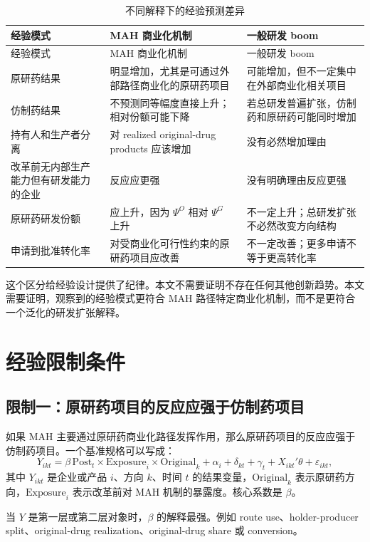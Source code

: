 \documentclass[12pt]{article}
\newcommand{\Post}{\mathrm{Post}}
\newcommand{\Original}{\mathrm{Original}}
\newcommand{\Exposure}{\mathrm{Exposure}}
\begin{document}
\begin{longtable}{p{}p{}p{}}
\caption{不同解释下的经验预测差异}\label{tab:rdboom_cn}\\
\toprule
经验模式 & MAH 商业化机制 & 一般研发 boom \\
\midrule
\endfirsthead
\toprule
经验模式 & MAH 商业化机制 & 一般研发 boom \\
\midrule
\endhead
原研药结果 & 明显增加，尤其是可通过外部路径商业化的原研药项目 & 可能增加，但不一定集中在外部商业化相关项目 \\
\addlinespace
仿制药结果 & 不预测同等幅度直接上升；相对份额可能下降 & 若总研发普遍扩张，仿制药和原研药可能同时增加 \\
\addlinespace
持有人和生产者分离 & 对 realized original-drug products 应该增加 & 没有必然增加理由 \\
\addlinespace
改革前无内部生产能力但有研发能力的企业 & 反应应更强 & 没有明确理由反应更强 \\
\addlinespace
原研药研发份额 & 应上升，因为 $\Psi^O$ 相对 $\Psi^G$ 上升 & 不一定上升；总研发扩张不必然改变方向结构 \\
\addlinespace
申请到批准转化率 & 对受商业化可行性约束的原研药项目应改善 & 不一定改善；更多申请不等于更高转化率 \\
\bottomrule
\end{longtable}

这个区分给经验设计提供了纪律。本文不需要证明不存在任何其他创新趋势。本文需要证明，观察到的经验模式更符合 MAH 路径特定商业化机制，而不是更符合一个泛化的研发扩张解释。

\section{经验限制条件}

\subsection{限制一：原研药项目的反应应强于仿制药项目}

如果 MAH 主要通过原研药商业化路径发挥作用，那么原研药项目的反应应强于仿制药项目。一个基准规格可以写成：
\[
Y_{ikt}=\beta\,\Post_t\times \Exposure_i\times \Original_k
+\alpha_i+\delta_{kt}+\gamma_t+X_{ikt}'\theta+\varepsilon_{ikt},
\]
其中 $Y_{ikt}$ 是企业或产品 $i$、方向 $k$、时间 $t$ 的结果变量，$\Original_k$ 表示原研药方向，$\Exposure_i$ 表示改革前对 MAH 机制的暴露度。核心系数是 $\beta$。

当 $Y$ 是第一层或第二层对象时，$\beta$ 的解释最强。例如 route use、holder-producer split、original-drug realization、original-drug share 或 conversion。
\end{document}
